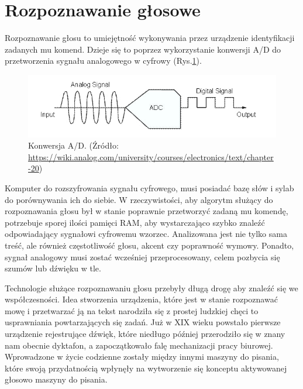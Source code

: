 
\section{Rozpoznawanie głosowe}
\label{sec:rozpoznawanieGlosowe}

Rozpoznawanie głosu to umiejętność wykonywania przez urządzenie identyfikacji zadanych mu komend. Dzieje się to poprzez wykorzystanie konwersji A/D do przetworzenia sygnału analogowego w cyfrowy (Rys.\ref{fig:ad}). 

\begin{figure}[h]
    \centering
    \includegraphics{files/ad.jpg}
    \caption{Konwersja A/D. (Źródło: \url{https://wiki.analog.com/university/courses/electronics/text/chapter-20})}
    \label{fig:ad}
\end{figure}

Komputer do rozszyfrowania sygnału cyfrowego, musi posiadać bazę słów i sylab do porównywania ich do siebie. W rzeczywistości, aby algorytm służący do rozpoznawania głosu był w stanie poprawnie przetworzyć zadaną mu komendę, potrzebuje sporej ilości pamięci RAM, aby wystarczająco szybko znaleźć odpowiadający sygnałowi cyfrowemu wzorzec. Analizowana jest nie tylko sama treść, ale również częstotliwość głosu, akcent czy poprawność wymowy. Ponadto, sygnał analogowy musi zostać wcześniej przeprocesowany, celem pozbycia się szumów lub dźwięku w tle.

Technologie służące rozpoznawaniu głosu przebyły długą drogę aby znaleźć się we współczesności. Idea stworzenia urządzenia, które jest w stanie rozpoznawać mowę i przetwarzać ją na tekst narodziła się z prostej ludzkiej chęci to usprawniania powtarzających się zadań. Już w XIX wieku powstało pierwsze urządzenie rejestrujące dźwięk, które niedługo później przerodziło się w znany nam obecnie dyktafon, a zapoczątkowało falę mechanizacji pracy biurowej. Wprowadzone w życie codzienne zostały między innymi maszyny do pisania, które swoją przydatnością wpłynęły na wytworzenie się konceptu aktywowanej głosowo maszyny do pisania. 

